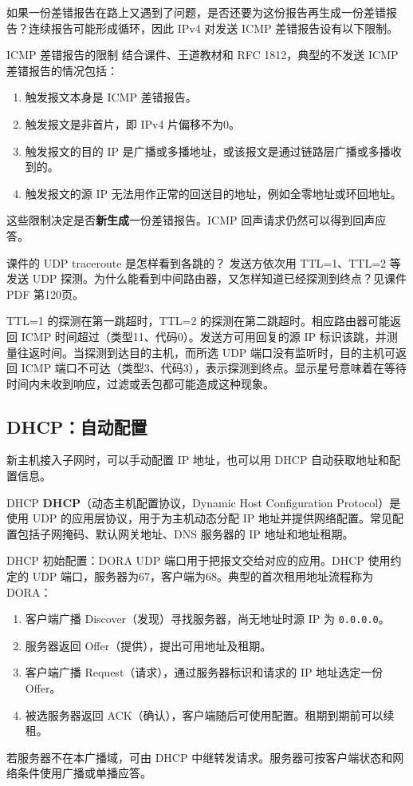 如果一份差错报告在路上又遇到了问题，是否还要为这份报告再生成一份差错报告？连续报告可能形成循环，因此 IPv4 对发送 ICMP 差错报告设有以下限制。

\begin{proposition}{ICMP 差错报告的限制}
结合课件、王道教材和 RFC 1812，典型的不发送 ICMP 差错报告的情况包括：
\begin{enumerate}[nosep]
  \item 触发报文本身是 ICMP 差错报告。
  \item 触发报文是非首片，即 IPv4 片偏移不为0。
  \item 触发报文的目的 IP 是广播或多播地址，或该报文是通过链路层广播或多播收到的。
  \item 触发报文的源 IP 无法用作正常的回送目的地址，例如全零地址或环回地址。
\end{enumerate}
这些限制决定是否\textbf{新生成}一份差错报告。ICMP 回声请求仍然可以得到回声应答。
\end{proposition}

\begin{example}{课件的 UDP traceroute 是怎样看到各跳的？}
发送方依次用 TTL=1、TTL=2 等发送 UDP 探测。为什么能看到中间路由器，又怎样知道已经探测到终点？见课件 PDF 第120页。
\end{example}
\begin{solution}
TTL=1 的探测在第一跳超时，TTL=2 的探测在第二跳超时。相应路由器可能返回 ICMP 时间超过（类型11、代码0）。发送方可用回复的源 IP 标识该跳，并测量往返时间。当探测到达目的主机，而所选 UDP 端口没有监听时，目的主机可返回 ICMP 端口不可达（类型3、代码3），表示探测到终点。显示星号意味着在等待时间内未收到响应，过滤或丢包都可能造成这种现象。
\end{solution}

\subsection{DHCP：自动配置}
新主机接入子网时，可以手动配置 IP 地址，也可以用 DHCP 自动获取地址和配置信息。
\begin{definition}{DHCP}
\textbf{DHCP}（动态主机配置协议，Dynamic Host Configuration Protocol）是使用 UDP 的应用层协议，用于为主机动态分配 IP 地址并提供网络配置。常见配置包括子网掩码、默认网关地址、DNS 服务器的 IP 地址和地址租期。
\end{definition}

\begin{proposition}{DHCP 初始配置：DORA}
UDP 端口用于把报文交给对应的应用。DHCP 使用约定的 UDP 端口，服务器为67，客户端为68。典型的首次租用地址流程称为 DORA：
\begin{enumerate}[nosep]
\item 客户端广播 Discover（发现）寻找服务器，尚无地址时源 IP 为 \texttt{0.0.0.0}。
\item 服务器返回 Offer（提供），提出可用地址及租期。
\item 客户端广播 Request（请求），通过服务器标识和请求的 IP 地址选定一份 Offer。
\item 被选服务器返回 ACK（确认），客户端随后可使用配置。租期到期前可以续租。
\end{enumerate}
若服务器不在本广播域，可由 DHCP 中继转发请求。服务器可按客户端状态和网络条件使用广播或单播应答。
\end{proposition}

